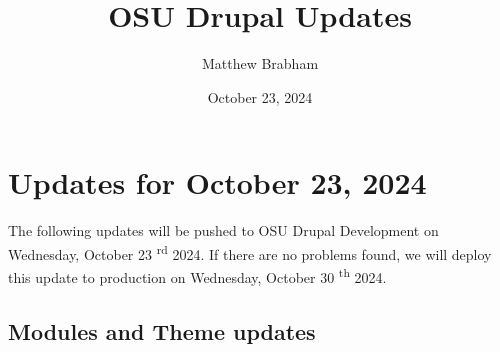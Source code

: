
\title{OSU Drupal Updates}
\author{Matthew Brabham}
\date{October 23, 2024}

    \maketitle
    \tableofcontents


    \section{Updates for October 23, 2024}
    The following updates will be pushed to OSU Drupal Development on Wednesday, October 23 \textsuperscript{rd} 2024.
    If there are no problems found, we will deploy this update to production on Wednesday, October 30 \textsuperscript{th} 2024.

    \subsection{Modules and Theme updates}

